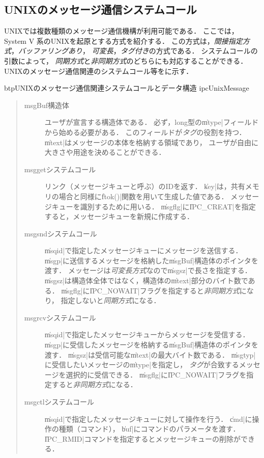 \subsection{UNIXのメッセージ通信システムコール}
UNIXでは複数種類のメッセージ通信機構が利用可能である．
ここでは，System V 系のUNIXを起原とする方式を紹介する．
この方式は，\emph{間接指定方式}，\emph{バッファリングあり}，
\emph{可変長}，\emph{タグ付き}の方式である．
システムコールの引数によって，
\emph{同期方式}と\emph{非同期方式}のどちらにも対応することができる．
UNIXのメッセージ通信関連のシステムコール等をに示す．

\begin{myfig}{btp}{UNIXのメッセージ通信関連システムコールとデータ構造}
  {ipcUnixMessage}
  
\end{myfig}

\begin{quote}
  \begin{description}
  \item [msgBuf構造体]
    ユーザが宣言する構造体である．
    必ず，long型の\|mtype|フィールドから始める必要がある．
    このフィールドが\emph{タグ}の役割を持つ．
    \|mtext|はメッセージの本体を格納する領域であり，
    ユーザが自由に大きさや用途を決めることができる．
  \item [msggetシステムコール]
    リンク（メッセージキューと呼ぶ）のIDを返す．
    \|key|は，共有メモリの場合と同様に\|ftok()|関数を用いて生成した値である．
    メッセージキューを識別するために用いる．
    \|msgflg|に\|IPC_CREAT|を指定すると，メッセージキューを新規に作成する．
  \item [msgsndシステムコール]
    \|msqid|で指定したメッセージキューにメッセージを送信する．
    \|msgp|に送信するメッセージを格納した\|msgBuf|構造体のポインタを渡す．
    メッセージは\emph{可変長方式}なので\|msgsz|で長さを指定する．
    \|msgsz|は構造体全体ではなく，構造体の\|mtext|部分のバイト数である．
    \|msgflg|に\|IPC_NOWAIT|フラグを指定すると\emph{非同期方式}になり，
    指定しないと\emph{同期方式}になる．
  \item [msgrcvシステムコール]
    \|msqid|で指定したメッセージキューからメッセージを受信する．
    \|msgp|に受信したメッセージを格納する\|msgBuf|構造体のポインタを渡す．
    \|msgsz|は受信可能な\|mtext|の最大バイト数である．
    \|msgtyp|に受信したいメッセージの\|mtype|を指定し，
    \emph{タグ}が合致するメッセージを選択的に受信できる．
    \|msgflg|に\|IPC_NOWAIT|フラグを指定すると\emph{非同期方式}になる．
  \item [msgctlシステムコール]
    \|msqid|で指定したメッセージキューに対して操作を行う．
    \|cmd|に操作の種類（コマンド），
    \|buf|にコマンドのパラメータを渡す．
    \|IPC_RMID|コマンドを指定するとメッセージキューの削除ができる．
  \end{description}
\end{quote}

